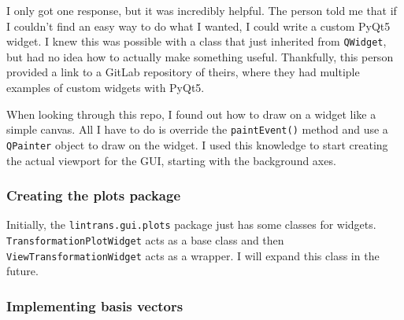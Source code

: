 \documentclass[../main.tex]{subfiles}
\begin{document}
I only got one response, but it was incredibly helpful. The person told me that if I couldn't find an easy way to do what I wanted, I could write a custom PyQt5 widget. I knew this was possible with a class that just inherited from \texttt{QWidget}, but had no idea how to actually make something useful. Thankfully, this person provided a link to a GitLab repository of theirs, where they had multiple examples of custom widgets with PyQt5\cite{gitlab-custom-widgets}.

When looking through this repo, I found out how to draw on a widget like a simple canvas. All I have to do is override the \texttt{paintEvent()} method and use a \texttt{QPainter} object to draw on the widget. I used this knowledge to start creating the actual viewport for the GUI, starting with the background axes.

\subsubsection{Creating the plots package\label{development:visualizing-matrices:creating-the-plots-package}}

Initially, the \texttt{lintrans.gui.plots} package just has some classes for widgets. \texttt{TransformationPlotWidget} acts as a base class and then \texttt{ViewTransformationWidget} acts as a wrapper. I will expand this class in the future.



\subsubsection{Implementing basis vectors\label{development:visualizing-matrices:implementing-basis-vectors}}
\end{document}
